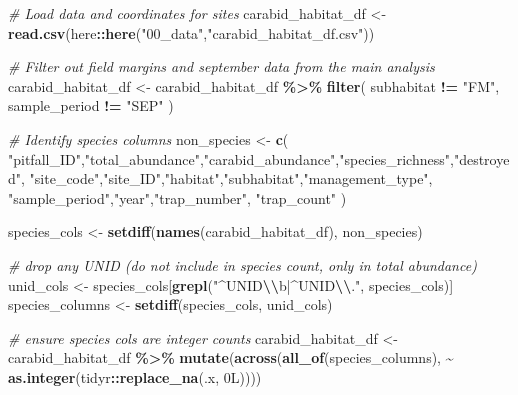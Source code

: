 \documentclass[
]{article}
\newenvironment{Shaded}{\begin{snugshade}}{\end{snugshade}}
\newcommand{\CommentTok}[1]{\textcolor[rgb]{0.56,0.35,0.01}{\textit{#1}}}
\newcommand{\DataTypeTok}[1]{\textcolor[rgb]{0.13,0.29,0.53}{#1}}
\newcommand{\DecValTok}[1]{\textcolor[rgb]{0.00,0.00,0.81}{#1}}
\newcommand{\FunctionTok}[1]{\textcolor[rgb]{0.13,0.29,0.53}{\textbf{#1}}}
\newcommand{\NormalTok}[1]{#1}
\newcommand{\OtherTok}[1]{\textcolor[rgb]{0.56,0.35,0.01}{#1}}
\newcommand{\SpecialCharTok}[1]{\textcolor[rgb]{0.81,0.36,0.00}{\textbf{#1}}}
\newcommand{\StringTok}[1]{\textcolor[rgb]{0.31,0.60,0.02}{#1}}
\begin{document}
\begin{Shaded}
\begin{Highlighting}[]
\CommentTok{\# Load data and coordinates for sites}
\NormalTok{carabid\_habitat\_df }\OtherTok{\textless{}{-}} \FunctionTok{read.csv}\NormalTok{(here}\SpecialCharTok{::}\FunctionTok{here}\NormalTok{(}\StringTok{"00\_data"}\NormalTok{,}\StringTok{"carabid\_habitat\_df.csv"}\NormalTok{))}

\CommentTok{\# Filter out field margins and september data from the main analysis}
\NormalTok{carabid\_habitat\_df }\OtherTok{\textless{}{-}}\NormalTok{ carabid\_habitat\_df }\SpecialCharTok{\%\textgreater{}\%}
  \FunctionTok{filter}\NormalTok{(}
\NormalTok{    subhabitat }\SpecialCharTok{!=} \StringTok{"FM"}\NormalTok{,}
\NormalTok{    sample\_period }\SpecialCharTok{!=} \StringTok{"SEP"}
\NormalTok{  )}


\CommentTok{\# Identify species columns}
\NormalTok{non\_species }\OtherTok{\textless{}{-}} \FunctionTok{c}\NormalTok{(}
  \StringTok{"pitfall\_ID"}\NormalTok{,}\StringTok{"total\_abundance"}\NormalTok{,}\StringTok{"carabid\_abundance"}\NormalTok{,}\StringTok{"species\_richness"}\NormalTok{,}\StringTok{"destroyed"}\NormalTok{,}
  \StringTok{"site\_code"}\NormalTok{,}\StringTok{"site\_ID"}\NormalTok{,}\StringTok{"habitat"}\NormalTok{,}\StringTok{"subhabitat"}\NormalTok{,}\StringTok{"management\_type"}\NormalTok{,}
  \StringTok{"sample\_period"}\NormalTok{,}\StringTok{"year"}\NormalTok{,}\StringTok{"trap\_number"}\NormalTok{, }\StringTok{"trap\_count"}
\NormalTok{)}

\NormalTok{species\_cols }\OtherTok{\textless{}{-}} \FunctionTok{setdiff}\NormalTok{(}\FunctionTok{names}\NormalTok{(carabid\_habitat\_df), non\_species)}

\CommentTok{\# drop any UNID (do not include in species count, only in total abundance)}
\NormalTok{unid\_cols }\OtherTok{\textless{}{-}}\NormalTok{ species\_cols[}\FunctionTok{grepl}\NormalTok{(}\StringTok{"\^{}UNID}\SpecialCharTok{\textbackslash{}\textbackslash{}}\StringTok{b|\^{}UNID}\SpecialCharTok{\textbackslash{}\textbackslash{}}\StringTok{."}\NormalTok{, species\_cols)]}
\NormalTok{species\_columns }\OtherTok{\textless{}{-}} \FunctionTok{setdiff}\NormalTok{(species\_cols, unid\_cols)}

\CommentTok{\# ensure species cols are integer counts}
\NormalTok{carabid\_habitat\_df }\OtherTok{\textless{}{-}}\NormalTok{ carabid\_habitat\_df }\SpecialCharTok{\%\textgreater{}\%}
  \FunctionTok{mutate}\NormalTok{(}\FunctionTok{across}\NormalTok{(}\FunctionTok{all\_of}\NormalTok{(species\_columns), }\SpecialCharTok{\textasciitilde{}} \FunctionTok{as.integer}\NormalTok{(tidyr}\SpecialCharTok{::}\FunctionTok{replace\_na}\NormalTok{(.x, }\DecValTok{0}\DataTypeTok{L}\NormalTok{))))}


\end{Highlighting}
\end{Shaded}
\end{document}
